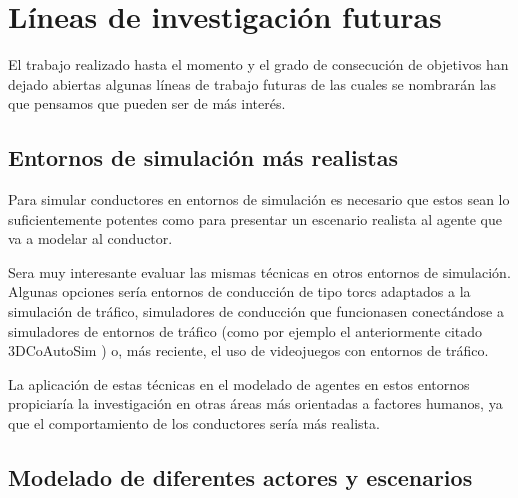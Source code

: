 \chapter{Líneas de investigación futuras}
\label{ch:future-work}

El trabajo realizado hasta el momento y el grado de consecución de objetivos han dejado abiertas algunas líneas de trabajo futuras de las cuales se nombrarán las que pensamos que pueden ser de más interés.

\section{Entornos de simulación más realistas}

Para simular conductores en entornos de simulación es necesario que estos sean lo suficientemente potentes como para presentar un escenario realista al agente que va a modelar al conductor.

Sera muy interesante evaluar las mismas técnicas en otros entornos de simulación. Algunas opciones sería entornos de conducción de tipo \ac{torcs} adaptados a la simulación de tráfico, simuladores de conducción que funcionasen conectándose a simuladores de entornos de tráfico (como por ejemplo el anteriormente citado 3DCoAutoSim \cite{olaverri2018implementation}) o, más reciente, el uso de videojuegos con entornos de tráfico.

La aplicación de estas técnicas en el modelado de agentes en estos entornos propiciaría la investigación en otras áreas más orientadas a factores humanos, ya que el comportamiento de los conductores sería más realista.

\section{Modelado de diferentes actores y escenarios}

